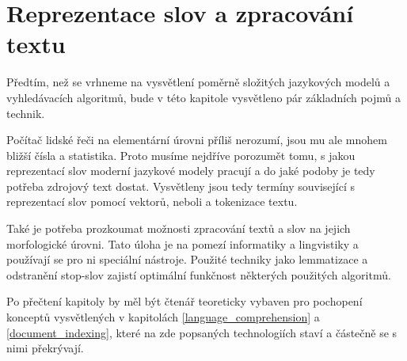 
\chapter{Reprezentace slov a zpracování textu}
\label{text_processing}

Předtím, než se vrhneme na vysvětlení poměrně složitých jazykových modelů a vyhledávacích algoritmů, bude v této kapitole vysvětleno pár základních pojmů a technik.\par 
Počítač lidské řeči na elementární úrovni příliš nerozumí, jsou mu ale mnohem bližší čísla a statistika. Proto musíme nejdříve porozumět tomu, s jakou reprezentací slov moderní jazykové modely pracují a do jaké podoby je tedy potřeba zdrojový text dostat. Vysvětleny jsou tedy termíny související s reprezentací slov pomocí vektorů, neboli  a tokenizace textu.\par 
Také je potřeba prozkoumat možnosti zpracování textů a slov na jejich morfologické úrovni. Tato úloha je na pomezí informatiky a lingvistiky a používají se pro ni speciální nástroje. Použité techniky jako lemmatizace a odstranění stop-slov zajistí optimální funkčnost některých použitých algoritmů.\par
Po přečtení kapitoly by měl být čtenář teoreticky vybaven pro pochopení konceptů vysvětlených v kapitolách \ref{language_comprehension} a \ref{document_indexing}, které na zde popsaných technologiích staví a částečně se s nimi překrývají.

